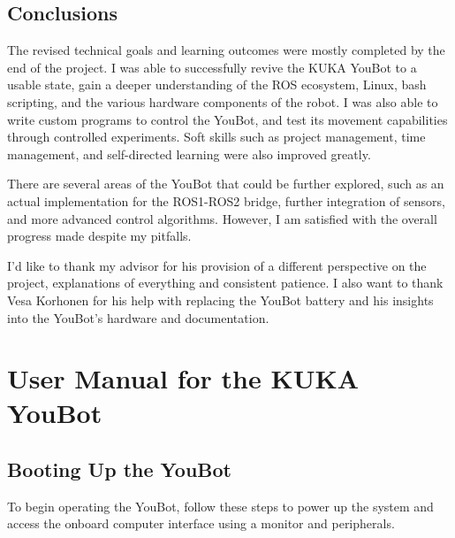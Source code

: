 \documentclass[a4paper, 12pt]{article}
\begin{document}
    \subsection{Conclusions}

    The revised technical goals and learning outcomes were mostly completed by the end of the project. I was able to successfully revive the KUKA YouBot to a usable state, gain a deeper understanding of the ROS ecosystem, Linux, bash scripting, and the various hardware components of the robot. I was also able to write custom programs to control the YouBot, and test its movement capabilities through controlled experiments. Soft skills such as project management, time management, and self-directed learning were also improved greatly. 
    
    There are several areas of the YouBot that could be further explored, such as an actual implementation for the ROS1-ROS2 bridge, further integration of sensors, and more advanced control algorithms. However, I am satisfied with the overall progress made despite my pitfalls. 

    I'd like to thank my advisor for his provision of a different perspective on the project, explanations of everything and consistent patience. I also want to thank Vesa Korhonen for his help with replacing the YouBot battery and his insights into the YouBot's hardware and documentation.


    \newpage

    \printbibliography

    \newpage

    \appendix


    \section{User Manual for the KUKA YouBot}

    \subsection{Booting Up the YouBot}
    To begin operating the YouBot, follow these steps to power up the system and access the onboard computer interface using a monitor and peripherals. 
\end{document}
